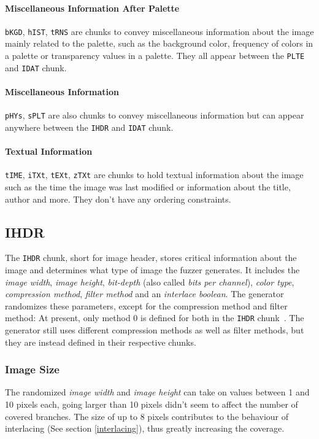 \documentclass[runningheads]{llncs}
\begin{document}
\paragraph{Miscellaneous Information After Palette}
\texttt{bKGD}, \texttt{hIST}, \texttt{tRNS} are chunks to convey miscellaneous information about the image mainly related to the palette, such as the background color, frequency of colors in a palette or transparency values in a palette. They all appear between the \texttt{PLTE} and \texttt{IDAT} chunk.

\paragraph{Miscellaneous Information}
\texttt{pHYs}, \texttt{sPLT} are also chunks to convey miscellaneous information but can appear anywhere between the \texttt{IHDR} and \texttt{IDAT} chunk.

\paragraph{Textual Information}
\texttt{tIME}, \texttt{iTXt}, \texttt{tEXt}, \texttt{zTXt} are chunks to hold textual information about the image such as the time the image was last modified or information about the title, author and more. They don't have any ordering constraints.

\subsection{IHDR}
The \texttt{IHDR} chunk, short for image header, stores critical information about the image and determines what type of image the fuzzer generates.
It includes the \textit{image width}, \textit{image height}, \textit{bit-depth} (also called \textit{bits per channel}), \textit{color type}, \textit{compression method}, \textit{filter method} and an \textit{interlace boolean}.
The generator randomizes these parameters, except for the compression method and filter method: At present, only method 0 is defined for both in the \texttt{IHDR} chunk~\cite{libpng_chunks}. The generator still uses different compression methods as well as filter methods, but they are instead defined in their respective chunks.

\subsubsection{Image Size}
The randomized \textit{image width} and \textit{image height} can take on values between 1 and 10 pixels each, going larger than 10 pixels didn't seem to affect the number of covered branches. 
The size of up to 8 pixels contributes to the behaviour of interlacing (See section \ref{interlacing}), thus greatly increasing the coverage.
\end{document}
